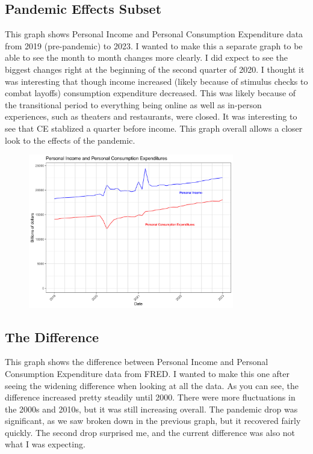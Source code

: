 \documentclass{article}
\begin{document}
\subsection{Pandemic Effects Subset}
This graph shows Personal Income and Personal Consumption Expenditure data from 2019 (pre-pandemic) to 2023. I wanted to make this a separate graph to be able to see the month to month changes more clearly. I did expect to see the biggest changes right at the beginning of the second quarter of 2020. I thought it was interesting that though income increased (likely because of stimulus checks to combat layoffs) consumption expenditure decreased. This was likely because of the transitional period to everything being online as well as in-person experiences, such as theaters and restaurants, were closed. It was interesting to see that CE stablized a quarter before income. This graph overall allows a closer look to the effects of the pandemic.

\begin{figure}[h]
\centering
\includegraphics[width=0.8\textwidth]{PS6b_Gallart.png}
\end{figure}

\subsection{The Difference}
This graph shows the difference between Personal Income and Personal Consumption Expenditure data from FRED. I wanted to make this one after seeing the widening difference when looking at all the data. As you can see, the difference  increased pretty steadily until 2000. There were more fluctuations in the 2000s and 2010s, but it was still increasing overall. The pandemic drop was significant, as we saw broken down in the previous graph, but it recovered fairly quickly. The second drop surprised me, and the current difference was also not what I was expecting.
\end{document}
